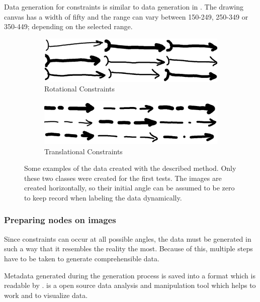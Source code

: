 Data generation for constraints is similar to data generation in \cite{Lawrence2020}.
The drawing canvas has a width of fifty and the range can vary between 150-249, 250-349 or 350-449; depending on the selected range.

\begin{figure}
    \centering
    \begin{subfigure}[b]{0.45\textwidth}
        \includegraphics[width=\textwidth]{images/rs.png}
        \caption{Rotational Constraints}
        \label{fig:rotational_constraints}
    \end{subfigure}
    \begin{subfigure}[b]{0.45\textwidth}
        \includegraphics[width=\textwidth]{images/ts.png}
        \caption{Translational Constraints}
        \label{fig:translational_constraints}
    \end{subfigure}
    \caption{Some examples of the data created with the described method. Only these two classes were created for the first tests. The images are created horizontally, so their initial angle can be assumed to be zero to keep record when labeling the data dynamically. }
    \label{fig:generated_data_samples}
\end{figure}

\subsubsection{Preparing nodes on images}

Since constraints can occur at all possible angles, the data must be generated in such a way that it resembles the reality the most.
Because of this, multiple steps have to be taken to generate comprehensible data.

Metadata generated during the generation process is saved into a format which is readable by . %
 is a open source data analysis and manipulation tool which helps to work and to visualize data.

